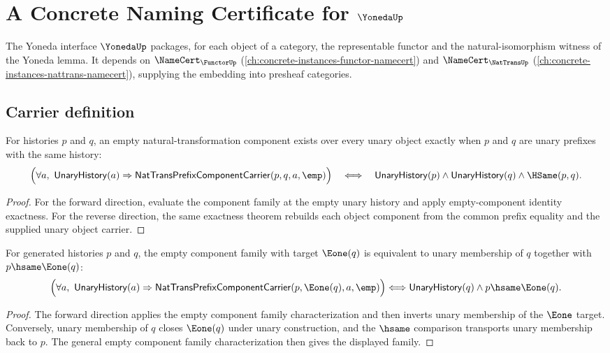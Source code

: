 \chapter{A Concrete Naming Certificate for $\YonedaUp$}
\label{ch:concrete-instances-yoneda-namecert}

The Yoneda interface $\YonedaUp$ packages, for each object of a category, the representable functor and the natural-isomorphism witness of the Yoneda lemma. It depends on $\NameCert_{\FunctorUp}$ (\autoref{ch:concrete-instances-functor-namecert}) and $\NameCert_{\NatTransUp}$ (\autoref{ch:concrete-instances-nattrans-namecert}), supplying the embedding into presheaf categories.

\section{Carrier definition}
\label{sec:yoneda-carrier}

\begin{theorem}
\label{thm:yoneda-representable-empty-component-family-iff}
For histories $p$ and $q$, an empty natural-transformation component exists
over every unary object exactly when $p$ and $q$ are unary prefixes with the
same history:
$$
\Bigl(\forall a,\ \mathsf{UnaryHistory}(a)\Rightarrow
\mathsf{NatTransPrefixComponentCarrier}(p,q,a,\emp)\Bigr)
\quad\Longleftrightarrow\quad
\mathsf{UnaryHistory}(p)\wedge\mathsf{UnaryHistory}(q)\wedge\HSame(p,q).
$$
\end{theorem}
\begin{proof}
For the forward direction, evaluate the component family at the empty unary
history and apply empty-component identity exactness. For the reverse direction,
the same exactness theorem rebuilds each object component from the common prefix
equality and the supplied unary object carrier.
\end{proof}

\begin{theorem}
\label{thm:yoneda-representable-empty-component-family-e1-target-iff}
For generated histories $p$ and $q$, the empty component family with target
$\Eone(q)$ is equivalent to unary membership of $q$ together with
$p\hsame\Eone(q)$:
$$
\Bigl(\forall a,\ \mathsf{UnaryHistory}(a)\Rightarrow
\mathsf{NatTransPrefixComponentCarrier}(p,\Eone(q),a,\emp)\Bigr)
\Longleftrightarrow
\mathsf{UnaryHistory}(q)\land p\hsame\Eone(q).
$$
\end{theorem}
\begin{proof}
The forward direction applies the empty component family characterization and
then inverts unary membership of the $\Eone$ target. Conversely, unary
membership of $q$ closes $\Eone(q)$ under unary construction, and the
$\hsame$ comparison transports unary membership back to $p$. The general empty
component family characterization then gives the displayed family.
\end{proof}

